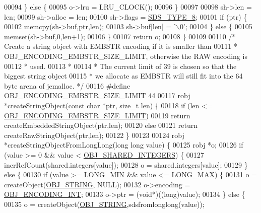 \begin{DoxyCode}
00094     \} \textcolor{keywordflow}{else} \{
00095         o->lru = LRU\_CLOCK();
00096     \}
00097 
00098     sh->len = len;
00099     sh->alloc = len;
00100     sh->flags = \hyperlink{sds_8h_a504136356f04bfa2fd616dd4c8fdd71c}{SDS\_TYPE\_8};
00101     \textcolor{keywordflow}{if} (ptr) \{
00102         memcpy(sh->buf,ptr,len);
00103         sh->buf[len] = \textcolor{stringliteral}{'\(\backslash\)0'};
00104     \} \textcolor{keywordflow}{else} \{
00105         memset(sh->buf,0,len+1);
00106     \}
00107     \textcolor{keywordflow}{return} o;
00108 \}
00109 
00110 \textcolor{comment}{/* Create a string object with EMBSTR encoding if it is smaller than}
00111 \textcolor{comment}{ * OBJ\_ENCODING\_EMBSTR\_SIZE\_LIMIT, otherwise the RAW encoding is}
00112 \textcolor{comment}{ * used.}
00113 \textcolor{comment}{ *}
00114 \textcolor{comment}{ * The current limit of 39 is chosen so that the biggest string object}
00115 \textcolor{comment}{ * we allocate as EMBSTR will still fit into the 64 byte arena of jemalloc. */}
00116 \textcolor{preprocessor}{#}\textcolor{preprocessor}{define} \textcolor{preprocessor}{OBJ\_ENCODING\_EMBSTR\_SIZE\_LIMIT} 44
00117 robj *createStringObject(\textcolor{keyword}{const} \textcolor{keywordtype}{char} *ptr, size\_t len) \{
00118     \textcolor{keywordflow}{if} (len <= \hyperlink{object_8c_a3e762d5fac271c94b01875920ff57fb2}{OBJ\_ENCODING\_EMBSTR\_SIZE\_LIMIT})
00119         \textcolor{keywordflow}{return} createEmbeddedStringObject(ptr,len);
00120     \textcolor{keywordflow}{else}
00121         \textcolor{keywordflow}{return} createRawStringObject(ptr,len);
00122 \}
00123 
00124 robj *createStringObjectFromLongLong(\textcolor{keywordtype}{long} \textcolor{keywordtype}{long} value) \{
00125     robj *o;
00126     \textcolor{keywordflow}{if} (value >= 0 && value < \hyperlink{server_8h_a311fc8b18b93af94e1ad418f1386b519}{OBJ\_SHARED\_INTEGERS}) \{
00127         incrRefCount(shared.integers[value]);
00128         o = shared.integers[value];
00129     \} \textcolor{keywordflow}{else} \{
00130         \textcolor{keywordflow}{if} (value >= LONG\_MIN && value <= LONG\_MAX) \{
00131             o = createObject(\hyperlink{server_8h_a65236ea160f69cdef33ec942092af88f}{OBJ\_STRING}, NULL);
00132             o->encoding = \hyperlink{server_8h_ae934cf008a0be0ef009c92c2d006a816}{OBJ\_ENCODING\_INT};
00133             o->ptr = (\textcolor{keywordtype}{void}*)((\textcolor{keywordtype}{long})value);
00134         \} \textcolor{keywordflow}{else} \{
00135             o = createObject(\hyperlink{server_8h_a65236ea160f69cdef33ec942092af88f}{OBJ\_STRING},sdsfromlonglong(value));

\end{DoxyCode}
